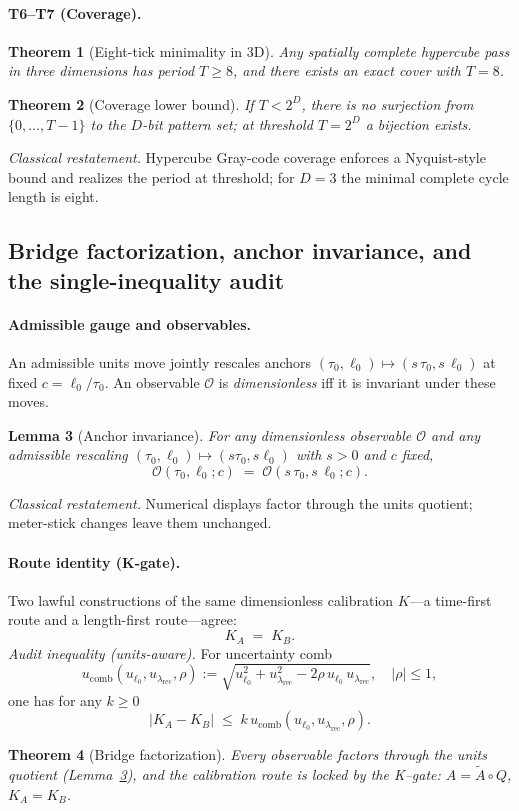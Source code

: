 \documentclass[11pt]{article}
\newtheorem{theorem}{Theorem}[section]
\newtheorem{lemma}[theorem]{Lemma}
\begin{document}
\paragraph{T6--T7 (Coverage).}
\begin{theorem}[Eight-tick minimality in 3D]\label{thm:T6}
Any spatially complete hypercube pass in three dimensions has period $T\ge 8$, and there exists an exact cover with $T=8$.
\end{theorem}
\begin{theorem}[Coverage lower bound]\label{thm:T7}
If $T<2^D$, there is no surjection from $\{0,\dots,T\!-\!1\}$ to the $D$-bit pattern set; at threshold $T=2^D$ a bijection exists.
\end{theorem}
\emph{Classical restatement.} Hypercube Gray-code coverage enforces a Nyquist-style bound and realizes the period at threshold; for $D=3$ the minimal complete cycle length is eight.

\subsection{Bridge factorization, anchor invariance, and the single-inequality audit}\label{subsec:bridge-factorization}

\paragraph{Admissible gauge and observables.}
An admissible units move jointly rescales anchors $(\tau_0,\ell_0)\mapsto(s\,\tau_0,s\,\ell_0)$ at fixed $c=\ell_0/\tau_0$. An observable $\mathcal{O}$ is \emph{dimensionless} iff it is invariant under these moves.

\begin{lemma}[Anchor invariance]\label{lem:anchor-invariance}
For any dimensionless observable $\mathcal{O}$ and any admissible rescaling $(\tau_0,\ell_0)\mapsto(s\tau_0,s\ell_0)$ with $s>0$ and $c$ fixed,
\[
\mathcal{O}(\tau_0,\ell_0;c) \;=\; \mathcal{O}(s\,\tau_0,s\,\ell_0;c).
\]
\end{lemma}
\emph{Classical restatement.} Numerical displays factor through the units quotient; meter-stick changes leave them unchanged.

\paragraph{Route identity (K-gate).}
Two lawful constructions of the same dimensionless calibration $K$---a time-first route and a length-first route---agree:
\[
K_A \;=\; K_B .
\]
\emph{Audit inequality (units-aware).} For uncertainty comb
\[
u_{\mathrm{comb}}(u_{\ell_0},u_{\lambda_{\mathrm{rec}}},\rho)
:= \sqrt{u_{\ell_0}^2 + u_{\lambda_{\mathrm{rec}}}^2 - 2\rho\,u_{\ell_0}\,u_{\lambda_{\mathrm{rec}}}},
\quad |\rho|\le 1,
\]
one has for any $k\ge 0$
\[
\big|K_A - K_B\big| \;\le\; k\,u_{\mathrm{comb}}(u_{\ell_0},u_{\lambda_{\mathrm{rec}}},\rho).
\]
\begin{theorem}[Bridge factorization]\label{thm:factorization}
Every observable factors through the units quotient (Lemma~\ref{lem:anchor-invariance}), and the calibration route is locked by the K–gate: $A=\tilde A\!\circ\!Q$, $K_A=K_B$.
\end{theorem}
%   
\end{document}
